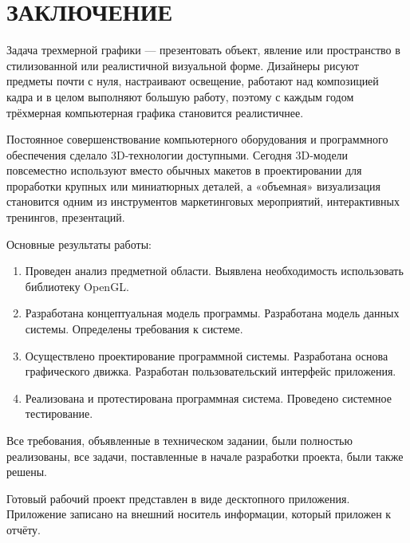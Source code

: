 \section*{ЗАКЛЮЧЕНИЕ}

Задача трехмерной графики — презентовать объект, явление или пространство в стилизованной или реалистичной визуальной форме. Дизайнеры рисуют предметы почти с нуля, настраивают освещение, работают над композицией кадра и в целом выполняют большую работу, поэтому с каждым годом трёхмерная компьютерная графика становится реалистичнее.

Постоянное совершенствование компьютерного оборудования и программного обеспечения сделало 3D-технологии доступными. Сегодня 3D-модели повсеместно используют вместо обычных макетов в проектировании для проработки крупных или миниатюрных деталей, а «объемная» визуализация становится одним из инструментов маркетинговых мероприятий, интерактивных тренингов, презентаций.

Основные результаты работы:

\begin{enumerate}
\item Проведен анализ предметной области. Выявлена необходимость использовать библиотеку OpenGL.
\item Разработана концептуальная модель программы. Разработана модель данных системы. Определены требования к системе.
\item Осуществлено проектирование программной системы. Разработана основа графического движка. Разработан пользовательский интерфейс приложения.
\item Реализована и протестирована программная система. Проведено системное тестирование.
\end{enumerate}

Все требования, объявленные в техническом задании, были полностью реализованы, все задачи, поставленные в начале разработки проекта, были также решены.

Готовый рабочий проект представлен в виде десктопного приложения. Приложение записано на внешний носитель информации, который приложен к отчёту.  